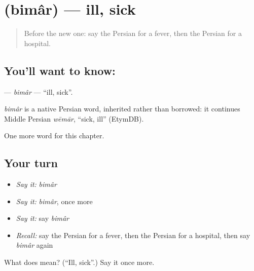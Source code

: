 \section[\texorpdfstring{\fa{بیمار} (bimâr)}{بیمار (bimâr)}]{ (bimâr) — ill, sick}

\label{lesson:FA-C30-bimar}



\begin{quote}
Before the new one: say the Persian for a fever, then the Persian for a hospital.
\end{quote}

\subsection*{You'll want to know: }
\textbf{} — \emph{bimâr} — \textquotedblleft{}ill, sick\textquotedblright{}.

\begin{cousinweb}
\emph{bimâr} is a native Persian word, inherited rather than borrowed: it continues Middle Persian \emph{wēmār}, \textquotedblleft{}sick, ill\textquotedblright{} (EtymDB).
\end{cousinweb}

\begin{grammarlens}[title={What you've built}]
One more word for this chapter.
\end{grammarlens}

\subsection*{Your turn}
\begin{itemize}
\raggedright
  \item \emph{Say it:} \emph{bimâr}
  \item \emph{Say it:} \emph{bimâr}, once more
  \item \emph{Say it:} say \emph{bimâr}
  \item \emph{Recall:} say the Persian for a fever, then the Persian for a hospital, then say \emph{bimâr} again
\end{itemize}

\begin{tcolorbox}[breakable,colback=teal!4,colframe=teal!35!black,title={Before you move on}]
What does  mean? (\textquotedblleft{}Ill, sick\textquotedblright{}.) Say it once more.
\end{tcolorbox}

